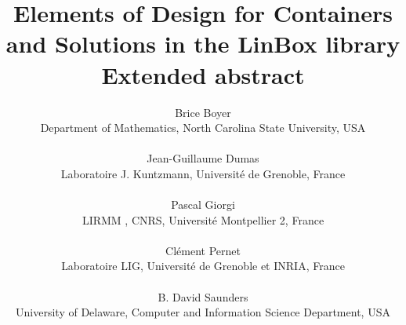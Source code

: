\documentclass[a4paper]{article}
\newcommand{\keywords}[1]{\par\addvspace\baselineskip
\noindent\keywordname\enspace\ignorespaces#1}
\def\textsf#1{{\biolinum #1}}
\newcommand\linbox{\textsf{LinBox}\xspace}
\begin{document}

% 



\title{Elements of Design for Containers and Solutions in the \linbox library \\
	\large{Extended abstract}}
%
\author{Brice Boyer\\%
	\renewcommand{\thefootnote}{\fnsymbol{footnote}}
	\normalsize{Department of Mathematics, North Carolina State University,
	USA}\footnotemark[4]\\
	 \\[0.2em]
%
	Jean-Guillaume Dumas\\%
	\normalsize{Laboratoire J. Kuntzmann, Universit\'e de Grenoble,
	France}\footnotemark[5]\\
	 \\[0.2em]
%
Pascal Giorgi \\%
\normalsize{LIRMM%
	, CNRS, Universit\'e Montpellier 2,
France}
\footnotemark[5]\\
	 \\[0.2em]
%
Cl\'ement Pernet \\%
	\normalsize{Laboratoire LIG, Universit\'e de Grenoble et INRIA,
	France}\footnotemark[5]\\
	\\[0.2em]
%
B. David Saunders \\%
	\normalsize{University of Delaware, Computer and Information Science Department,
	USA}%
	\footnotemark[4]\\
}
\end{document}
